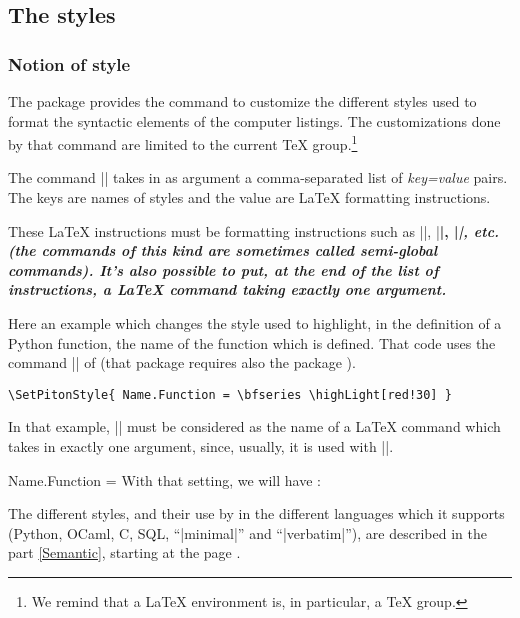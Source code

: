 \documentclass{article}
\begin{document}
\subsection{The styles}

\label{styles}

\subsubsection{Notion of style}

The package  provides the command
 to customize the different styles used to
format the syntactic elements of the computer listings. The customizations done
by that command are limited to the current TeX group.\footnote{We remind that
a LaTeX environment is, in particular, a TeX group.}

\bigskip
{}
The command |\SetPitonStyle| takes in as argument a comma-separated list of
\textsl{key=value} pairs. The keys are names of styles and the value are LaTeX
formatting instructions.

\bigskip
These LaTeX instructions must be formatting instructions such as
|\color{ }|, |\bfseries|, |\slshape|, etc. (the commands of this kind are
sometimes called \emph{semi-global} commands). It's also possible to put,
\emph{at the end of the list of instructions}, a LaTeX command taking exactly
one argument.

\bigskip
Here an example which changes the style used to highlight, in the definition
of a Python function, the name of the function which is defined. That code
uses the command |\highLight| of  (that package requires also the
package ).

\begin{verbatim}
\SetPitonStyle{ Name.Function = \bfseries \highLight[red!30] }
\end{verbatim}

In that example, |\highLight[red!30]| must be considered as the name of a
LaTeX command which takes in exactly one argument, since, usually, it is used
with ||.

\medskip
\begingroup
\SetPitonStyle 
  { Name.Function = \bfseries \highLight[red!30] }
With that setting, we will have : 
\endgroup

\bigskip
The different styles, and their use by  in the different languages
which it supports (Python, OCaml, C, SQL, ``|minimal|'' and ``|verbatim|''),
are described in the part \ref{Semantic}, starting at the page
\pageref{Semantic}.  
\end{document}
